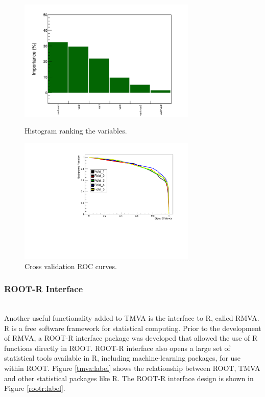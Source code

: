 \documentclass[a4paper]{jpconf}
\begin{document}
\begin{figure}[h]
\begin{minipage}{15pc}
\includegraphics[width=20pc]{img/vi.png}
\caption{\label{_vi} Histogram ranking the variables.}
\end{minipage}\hspace{4pc}%
\begin{minipage}{15pc}
\includegraphics[width=20pc]{img/cv.pdf}
\caption{\label{_cv} Cross validation ROC curves.}
\end{minipage}
\end{figure}

\subsubsection{ROOT-R Interface}\label{ROOTR}\hspace*{\fill} \\
Another useful functionality added to TMVA is the interface to R, called RMVA. R is a free software framework for statistical computing\cite{R}. Prior to the development of RMVA, a ROOT-R interface package was developed that allowed the  use of R functions directly in ROOT. ROOT-R interface also opens a large set of statistical tools available in R, including machine-learning packages, for use within ROOT. Figure \ref{tmva:label} shows the relationship between ROOT, TMVA and other statistical packages like R. The ROOT-R interface design is shown in Figure \ref{rootr:label}. 
\end{document}
